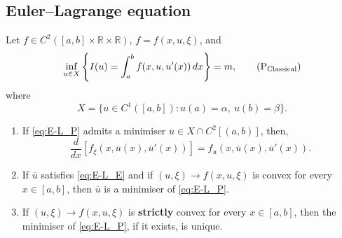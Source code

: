 \subsection{Euler--Lagrange equation}

\begin{theorem}
\label{thm:Euler-Lagrange}
    Let $f \in C^2([a,b]\times\mathbb{R}\times\mathbb{R})$, $f = f(x,u,\xi)$, and 
    \begin{equation}
        \inf_{u\in X} \left\{
        I(u) = \int_a^b f(x,u,u'(x))\,dx
        \right\} = m,
    \tag{$\text{P}_\text{Classical}$}
    \label{eq:E-L_P}
    \end{equation}
where
    \[
    X = \{u \in C^1([a,b]) : u(a)=\alpha,\ u(b)=\beta\}.
    \]
\begin{enumerate}

    \item[(i)] If \eqref{eq:E-L_P} admits a minimiser $\overline{u} \in X \cap C^2[(a,b)]$, then, 
    \begin{equation}
        \frac{d}{dx}[f_\xi(x,\overline{u}(x),\overline{u}'(x))] = f_u(x,\overline{u}(x),\overline{u}'(x)).
    \tag{E}
    \label{eq:E-L_E}
    \end{equation}
    
    \item[(ii)] If $\overline{u}$ satisfies \eqref{eq:E-L_E} and if $(u,\xi) \rightarrow f(x,u,\xi)$  is convex for every $x\in[a,b]$, then $\overline{u}$ is a minimiser of \eqref{eq:E-L_P}.

    \item[(iii)] If $(u,\xi) \rightarrow f(x,u,\xi)$  is \textbf{strictly} convex for every $x\in[a,b]$, then the minimiser of \eqref{eq:E-L_P}, if it exists, is unique.
\end{enumerate}

\end{theorem}

